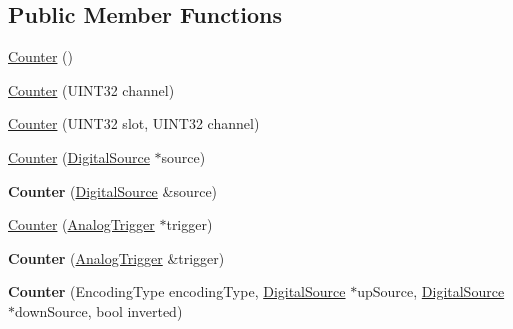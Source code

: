 \subsection*{\-Public \-Member \-Functions}
\begin{DoxyCompactItemize}
\item 
\hyperlink{classCounter_a1e05f69b5240fbab3e7ab351672167f0}{\-Counter} ()
\item 
\hyperlink{classCounter_a133b5a4e1dba8d8260000e25a9a4d124}{\-Counter} (\-U\-I\-N\-T32 channel)
\item 
\hyperlink{classCounter_abbcae190800d57671a56f1cd8ddb85df}{\-Counter} (\-U\-I\-N\-T32 slot, \-U\-I\-N\-T32 channel)
\item 
\hyperlink{classCounter_a9c7d57696e482eff75e1e03eaf6f8120}{\-Counter} (\hyperlink{classDigitalSource}{\-Digital\-Source} $\ast$source)
\item 
\hypertarget{classCounter_a21f3bf6b6692bff6906c59a00b31ee54}{{\bfseries \-Counter} (\hyperlink{classDigitalSource}{\-Digital\-Source} \&source)}\label{classCounter_a21f3bf6b6692bff6906c59a00b31ee54}

\item 
\hyperlink{classCounter_a51efc97323b6d5c42de11fa827655118}{\-Counter} (\hyperlink{classAnalogTrigger}{\-Analog\-Trigger} $\ast$trigger)
\item 
\hypertarget{classCounter_a7f3b71a90529ee3dffa442f113c4ad3f}{{\bfseries \-Counter} (\hyperlink{classAnalogTrigger}{\-Analog\-Trigger} \&trigger)}\label{classCounter_a7f3b71a90529ee3dffa442f113c4ad3f}

\item 
\hypertarget{classCounter_a37eface38998556665b5f88e35db7d16}{{\bfseries \-Counter} (\-Encoding\-Type encoding\-Type, \hyperlink{classDigitalSource}{\-Digital\-Source} $\ast$up\-Source, \hyperlink{classDigitalSource}{\-Digital\-Source} $\ast$down\-Source, bool inverted)}\label{classCounter_a37eface38998556665b5f88e35db7d16}


\end{DoxyCompactItemize}

